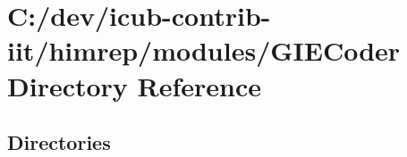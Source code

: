 \section{C\+:/dev/icub-\/contrib-\/iit/himrep/modules/\+G\+I\+E\+Coder Directory Reference}
\label{dir_ec4ab4788bddde6630238cdf1966c04a}
\subsection*{Directories}
\begin{DoxyCompactItemize}
\end{DoxyCompactItemize}
